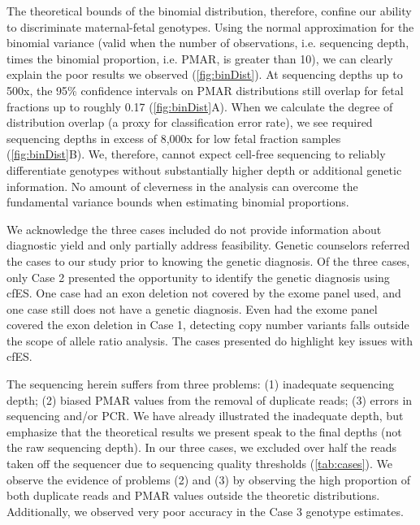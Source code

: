 \documentclass{article}\usepackage[]{graphicx}\usepackage[]{color}
\begin{document}
The theoretical bounds of the binomial distribution, therefore, confine our ability to discriminate maternal-fetal genotypes.
Using the normal approximation for the binomial variance (valid when the number of observations, i.e. sequencing depth, times the binomial proportion, i.e. PMAR, is greater than 10), we can clearly explain the poor results we observed (\cref{fig:binDist}).
At sequencing depths up to 500x, the 95\% confidence intervals on PMAR distributions still overlap for fetal fractions up to roughly 0.17 (\cref{fig:binDist}A).
When we calculate the degree of distribution overlap (a proxy for classification error rate), we see required sequencing depths in excess of 8,000x for low fetal fraction samples (\cref{fig:binDist}B).
We, therefore, cannot expect cell-free sequencing to reliably differentiate genotypes without substantially higher depth or additional genetic information.
No amount of cleverness in the analysis can overcome the fundamental variance bounds when estimating binomial proportions.

We acknowledge the three cases included do not provide information about diagnostic yield and only partially address feasibility.
Genetic counselors referred the cases to our study prior to knowing the genetic diagnosis.
Of the three cases, only Case 2 presented the opportunity to identify the genetic diagnosis using cfES.
One case had an exon deletion not covered by the exome panel used, and one case still does not have a genetic diagnosis.
Even had the exome panel covered the exon deletion in Case 1, detecting copy number variants falls outside the scope of allele ratio analysis.
The cases presented do highlight key issues with cfES.

The sequencing herein suffers from three problems: (1) inadequate sequencing depth; (2) biased PMAR values from the removal of duplicate reads; (3) errors in sequencing and/or PCR.
We have already illustrated the inadequate depth, but emphasize that the theoretical results we present speak to the final depths (not the raw sequencing depth).
In our three cases, we excluded over half the reads taken off the sequencer due to sequencing quality thresholds (\cref{tab:cases}).
We observe the evidence of problems (2) and (3) by observing the high proportion of both duplicate reads and PMAR values outside the theoretic distributions.
Additionally, we observed very poor accuracy in the Case 3 genotype estimates.
\end{document}
